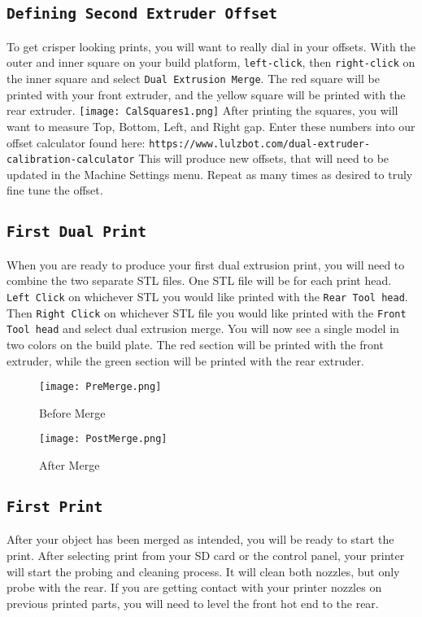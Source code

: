 \subsection{\texttt{Defining Second Extruder Offset}}
To get crisper looking prints, you will want to really dial in your offsets. With the outer and inner square on your build platform, \texttt{left-click}, then \texttt{right-click} on the inner square and select \texttt{Dual Extrusion Merge}. The red square will be printed with your front extruder, and the yellow square will be printed with the rear extruder.
\texttt{[image: CalSquares1.png]}
After printing the squares, you will want to measure Top, Bottom, Left, and Right gap. Enter these numbers into our offset calculator found here: \texttt{https://www.lulzbot.com/dual-extruder-calibration-calculator} This will produce new offsets, that will need to be updated in the Machine Settings menu. Repeat as many times as desired to truly fine tune the offset. 

\subsection{\texttt{First Dual Print}}
When you are ready to produce your first dual extrusion print, you will need to combine the two separate STL files. One STL file will be for each print head. \texttt{Left Click} on whichever STL you would like printed with the \texttt{Rear Tool head}. Then \texttt{Right Click} on whichever STL file you would like printed with the \texttt{Front Tool head} and select dual extrusion merge. You will now see a single model in two colors on the build plate. The red section will be printed with the front extruder, while the green section will be printed with the rear extruder. 

\begin{figure}[H]
\centering
\texttt{[image: PreMerge.png]}
\caption{Before Merge}
\label{fig:Before Merge}
\end{figure}

\begin{figure}[H]
\centering
\texttt{[image: PostMerge.png]}
\caption{After Merge}
\label{fig:After Merge}
\end{figure}

\subsection{\texttt{First Print}}
After your object has been merged as intended, you will be ready to start the print. After selecting print from your SD card or the control panel, your printer will start the probing and cleaning process. It will clean both nozzles, but only probe with the rear. If you are getting contact with your printer nozzles on previous printed parts, you will need to level the front hot end to the rear.

